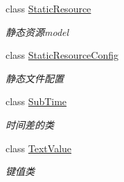 \begin{DoxyCompactItemize}
class \hyperlink{class_x_c_l_net_tools_1_1_entity_1_1_static_resource}{Static\+Resource}
\begin{DoxyCompactList}\small\item\em 静态资源model \end{DoxyCompactList}\item 
class \hyperlink{class_x_c_l_net_tools_1_1_entity_1_1_static_resource_config}{Static\+Resource\+Config}
\begin{DoxyCompactList}\small\item\em 静态文件配置 \end{DoxyCompactList}\item 
class \hyperlink{class_x_c_l_net_tools_1_1_entity_1_1_sub_time}{Sub\+Time}
\begin{DoxyCompactList}\small\item\em 时间差的类 \end{DoxyCompactList}\item 
class \hyperlink{class_x_c_l_net_tools_1_1_entity_1_1_text_value}{Text\+Value}
\begin{DoxyCompactList}\small\item\em 键值类 \end{DoxyCompactList}\end{DoxyCompactItemize}
